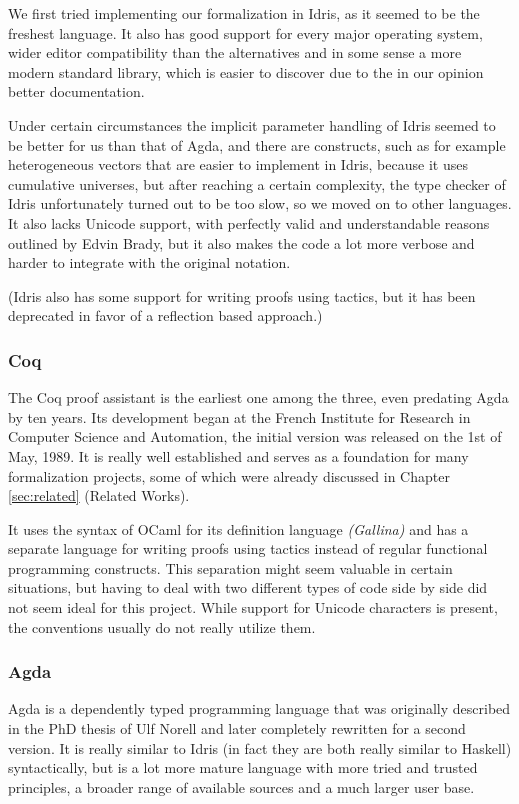 We first tried implementing our formalization in Idris, as it seemed to be the freshest language. It also has good support for every major operating system, wider editor compatibility than the alternatives and in some sense a more modern standard library, which is easier to discover due to the in our opinion better documentation.

Under certain circumstances the implicit parameter handling of Idris seemed to be better for us than that of Agda, and there are constructs, such as for example heterogeneous vectors that are easier to implement in Idris, because it uses cumulative universes, but after reaching a certain complexity, the type checker of Idris unfortunately turned out to be too slow, so we moved on to other languages. It also lacks Unicode support, with perfectly valid and understandable reasons outlined by Edvin Brady, but it also makes the code a lot more verbose and harder to integrate with the original notation.

(Idris also has some support for writing proofs using tactics, but it has been deprecated in favor of a reflection based approach.)

\subsubsection{Coq}
The Coq proof assistant\cite{the_coq_development_team_2020_3744225}\cite{Coq} is the earliest one among the three, even predating Agda by ten years. Its development began at the French Institute for Research in Computer Science and Automation, the initial version was released on the 1st of May, 1989. It is really well established and serves as a foundation for many formalization projects, some of which were already discussed in Chapter \ref{sec:related} (Related Works). 

It uses the syntax of OCaml for its definition language \textit{(Gallina)} and has a separate language for writing proofs using tactics instead of regular functional programming constructs. This separation might seem valuable in certain situations, but having to deal with two different types of code side by side did not seem ideal for this project. While support for Unicode characters is present, the conventions usually do not really utilize them.

\subsubsection{Agda}
Agda\cite{agda} is a dependently typed programming language that was originally described in the PhD thesis of Ulf Norell\cite{norell:thesis} and later completely rewritten for a second version. It is really similar to Idris (in fact they are both really similar to Haskell) syntactically, but is a lot more mature language with more tried and trusted principles, a broader range of available sources and a much larger user base.

